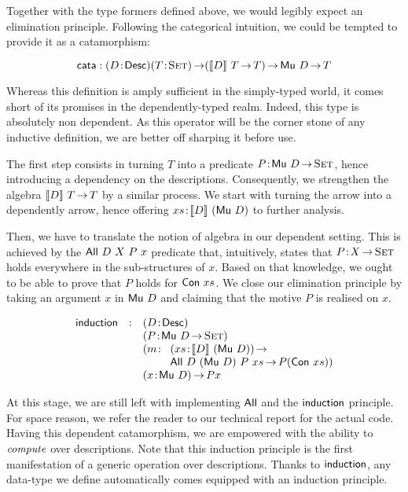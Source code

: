 Together with the type formers defined above, we would legibly expect
an elimination principle. Following the categorical intuition, we
could be tempted to provide it as a catamorphism:

\[
\F{cata} : \PITEL{D}{\Desc}
           \PI{T}{\Set}
           (\descop{D}{T} \To T) \To 
           \Mu{D} \To T 
\]

Whereas this definition is amply sufficient in the simply-typed world,
it comes short of its promises in the dependently-typed realm. Indeed,
this type is absolutely non dependent. As this operator will be the
corner stone of any inductive definition, we are better off sharping
it before use.

The first step consists in turning $T$ into a predicate
$\Bhab{P}{\Mu{D} \To \Set}$, hence introducing a dependency on the
descriptions. Consequently, we strengthen the algebra $\descop{D}{T}
\To T$ by a similar process. We start with turning the arrow into a
dependently arrow, hence offering $\Bhab{xs}{\descop{D}{(\Mu{D})}}$ to
further analysis. 

Then, we have to translate the notion of algebra in our dependent
setting. This is achieved by the $\All{D}{X}{P}{x}$ predicate that,
intuitively, states that $\Bhab{P}{X \To \Set}$ holds everywhere in
the sub-structures of $x$. Based on that knowledge, we ought to be
able to prove that $P$ holds for $\Con{xs}$. We close our elimination
principle by taking an argument $x$ in $\Mu{D}$ and claiming that the
motive $P$ is realised on $x$.

\[
\begin{array}{lcll}
\F{induction} & : & \multicolumn{2}{l}{\PITEL{D}{\Desc}}                   \\
              &   & \multicolumn{2}{l}{\PITEL{P}{\Mu{D} \To \Set}}         \\
              &   & \PITEL{m}{& \PI{xs}{\descop{D}{(\Mu{D})}}              \\
              &   &           & \All{D}{(\Mu{D})}{P}{xs} \To P (\Con{xs})} \\
              &   & \multicolumn{2}{l}{\PI{x}{\Mu{D}} P x}
\end{array}
\]

At this stage, we are still left with implementing $\F{All}$ and the
$\F{induction}$ principle. For space reason, we refer the reader to
our technical report for the actual code. Having this dependent
catamorphism, we are empowered with the ability to $\emph{compute}$
over descriptions. Note that this induction principle is the first
manifestation of a generic operation over descriptions. Thanks to
$\F{induction}$, any data-type we define automatically comes equipped
with an induction principle.

